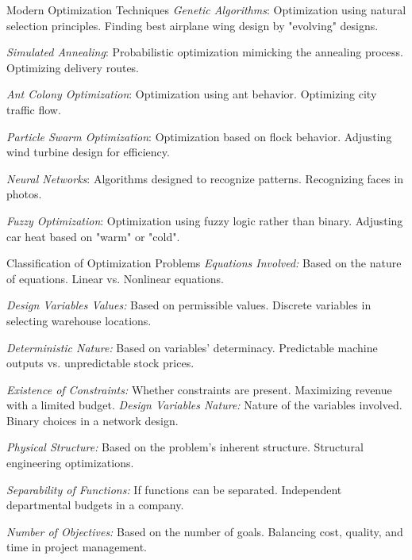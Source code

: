 \documentclass[
    NAME={Dr. Helga Ingimundardóttir},
    EMAIL={helgaingim@hi.is},
    FACULTY={Industrial Engineering},
    TITLE={Local and Global Optimization},
    SUBTITLE={Understanding Optima in Complex Landscapes},
    SEMINAR={VÉL113F},
    DATE={Design and Optimization},
    WIDE=true
]{../HI-latex/hi-beamer}
\begin{document}
    \begin{frame}{Modern Optimization Techniques}
        \small
        \emph{Genetic Algorithms}: Optimization using natural selection principles.
        \bi Finding best airplane wing design by "evolving" designs. \ei

        \emph{Simulated Annealing}: Probabilistic optimization mimicking the annealing process.
        \bi Optimizing delivery routes. \ei

        \emph{Ant Colony Optimization}: Optimization using ant behavior.
        \bi Optimizing city traffic flow.\ei

        \emph{Particle Swarm Optimization}: Optimization based on flock behavior.
        \bi Adjusting wind turbine design for efficiency.\ei

        \emph{Neural Networks}: Algorithms designed to recognize patterns.
        \bi Recognizing faces in photos.\ei

        \emph{Fuzzy Optimization}: Optimization using fuzzy logic rather than binary.
        \bi Adjusting car heat based on "warm" or "cold".\ei
    \end{frame}

    \begin{frame}{Classification of Optimization Problems}
        \emph{Equations Involved:} Based on the nature of equations.
        \bi Linear vs. Nonlinear equations.\ei

        \emph{Design Variables Values:} Based on permissible values.
        \bi Discrete variables in selecting warehouse locations.\ei

        \emph{Deterministic Nature:} Based on variables' determinacy.
        \bi Predictable machine outputs vs. unpredictable stock prices.\ei

        \emph{Existence of Constraints:} Whether constraints are present.
        \bi Maximizing revenue with a limited budget.\ei
        \framebreak
        \emph{Design Variables Nature:} Nature of the variables involved.
        \bi Binary choices in a network design.\ei

        \emph{Physical Structure:} Based on the problem's inherent structure.
        \bi Structural engineering optimizations.\ei

        \emph{Separability of Functions:} If functions can be separated.
        \bi Independent departmental budgets in a company. \ei

        \emph{Number of Objectives:} Based on the number of goals.
        \bi Balancing cost, quality, and time in project management. \ei

    \end{frame}
\end{document}
